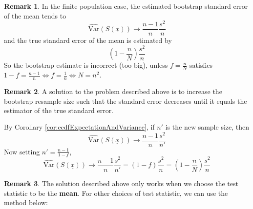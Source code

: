 \documentclass[12pt,a4paper]{article}
\theoremstyle{definition}
\newtheorem*{remark}{Remark}
\begin{document}
\begin{remark}
	In the finite population case, the estimated bootstrap standard error of the mean tends to
	\[
		\widehat{\text{Var}}(S(\underline{x})) \rightarrow \frac{n - 1}{n} \frac{s^2}{n}
	\]
	and the true standard error of the mean is estimated by
	\[
		\left( 1 - \frac{n}{N} \right) \frac{s^2}{n}
	\]
	So the bootstrap estimate is incorrect (too big), unless $f = \frac{n}{N}$ satisfies $1 - f = \frac{n - 1}{n} \Longleftrightarrow f = \frac{1}{n} \Longleftrightarrow N = n^2$.
\end{remark}

\begin{remark}
	A solution to the problem described above is to increase the bootstrap resample size such that the standard error decreases until it equals the estimator of the true standard error.

	By Corollary \ref{cor:ecdfExpectationAndVariance}, if $n'$ is the new sample size, then
	\[
		\widehat{\text{Var}}(S(\underline{x})) \rightarrow \frac{n - 1}{n} \frac{s^2}{n'}
	\]
	Now setting $n' = \frac{n - 1}{1 - f}$,
	\[
		\widehat{\text{Var}}(S(\underline{x})) \rightarrow \frac{n - 1}{n} \frac{s^2}{n'} = (1 - f) \frac{s^2}{n} = \left( 1 - \frac{n}{N} \right) \frac{s^2}{n}
	\]
\end{remark}

\begin{remark}
	The solution described above only works when we choose the test statistic to be the \textbf{mean}. For other choices of test statistic, we can use the method below:
\end{remark}
\end{document}
